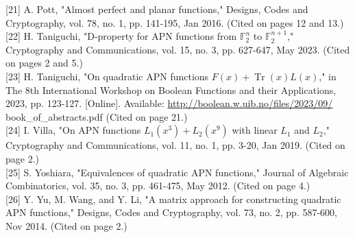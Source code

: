 \documentclass[10pt]{article}
\begin{document}
[21] A. Pott, "Almost perfect and planar functions," Designs, Codes and Cryptography, vol. 78, no. 1, pp. 141-195, Jan 2016. (Cited on pages 12 and 13.)\\[0pt]
[22] H. Taniguchi, "D-property for APN functions from $\mathbb{F}_{2}^{n}$ to $\mathbb{F}_{2}^{n+1}$," Cryptography and Communications, vol. 15, no. 3, pp. 627-647, May 2023. (Cited on pages 2 and 5.)\\[0pt]
[23] H. Taniguchi, "On quadratic APN functions $F(x)+\operatorname{Tr}(x) L(x)$," in The 8th International Workshop on Boolean Functions and their Applications, 2023, pp. 123-127. [Online]. Available: \href{http://boolean.w.uib.no/files/2023/09/}{http://boolean.w.uib.no/files/2023/09/} book\_of\_abstracts.pdf (Cited on page 21.)\\[0pt]
[24] I. Villa, "On APN functions $L_{1}\left(x^{3}\right)+L_{2}\left(x^{9}\right)$ with linear $L_{1}$ and $L_{2}$," Cryptography and Communications, vol. 11, no. 1, pp. 3-20, Jan 2019. (Cited on page 2.)\\[0pt]
[25] S. Yoshiara, "Equivalences of quadratic APN functions," Journal of Algebraic Combinatorics, vol. 35, no. 3, pp. 461-475, May 2012. (Cited on page 4.)\\[0pt]
[26] Y. Yu, M. Wang, and Y. Li, "A matrix approach for constructing quadratic APN functions," Designs, Codes and Cryptography, vol. 73, no. 2, pp. 587-600, Nov 2014. (Cited on page 2.)
\end{document}
